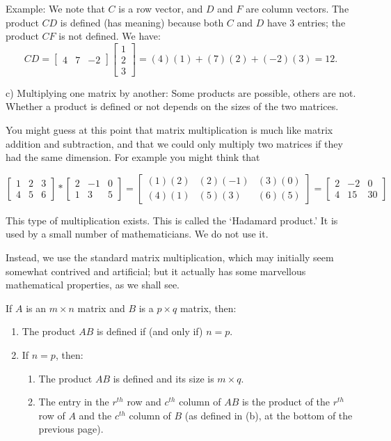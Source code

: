 \documentclass[12pt]{article}
\begin{document}
\bigskip

Example:  We note that $C$ is a row vector, and $D$ and $F$ are column vectors.
The product $CD$ is defined (has meaning) because both $C$ and $D$ have 3 entries;
the product $CF$ is not defined.  We have:
$$ CD =  \left[ \begin{array}{ccc}  4 & 7 & -2   \end{array} \right]
  \left[ \begin{array}{c}  1 \\ 2 \\ 3 \end{array} \right]
  = (4)(1) + (7)(2) + (-2)(3) = 12.$$

c) Multiplying one matrix by another:  Some products are possible, others are not.
Whether a product is defined or not depends on the sizes of the two matrices.

You might guess at this point that matrix multiplication is much like
matrix addition and subtraction, and that we could only multiply two
matrices if they had the same dimension.  For example you might think that

$$ 
    \left[ \begin{array}{ccc}  1 & 2 & 3 \\ 4 & 5 & 6  \end{array} \right]
     *
    \left[ \begin{array}{ccc}  2 & -1 & 0 \\ 1 & 3 & 5  \end{array} \right]
    =
    \left[ \begin{array}{ccc}  (1)(2) & (2)(-1) & (3)(0) \\ (4)(1) & (5)(3) & (6)(5)  \end{array} \right]
    =
    \left[ \begin{array}{ccc}  2 & -2 & 0 \\ 4 & 15 & 30  \end{array} \right]
$$

This type of multiplication exists.  This is called the `Hadamard product.'
It is used by a small number of  mathematicians.  We do not use it.

Instead, we use the standard matrix multiplication, which may initially seem
somewhat contrived and artificial; but it actually has some marvellous
mathematical properties, as we shall see.

If $A$ is an $m \times n$ matrix and $B$ is a $p \times q$ matrix, then:

  \begin{enumerate}
  \item The product $AB$ is defined if (and only if) $n = p$.
  \item If $n=p$, then:
    \begin{enumerate}
    \item The product $AB$ is defined and its size is $m \times q$.
    \item The entry in the $r^{th}$ row and $c^{th}$ column of $AB$ is
    the product of the $r^{th}$ row of $A$ and the $c^{th}$ column of $B$
    (as defined in (b), at the bottom of the previous page).
    \end{enumerate}
  \end{enumerate}
\end{document}
